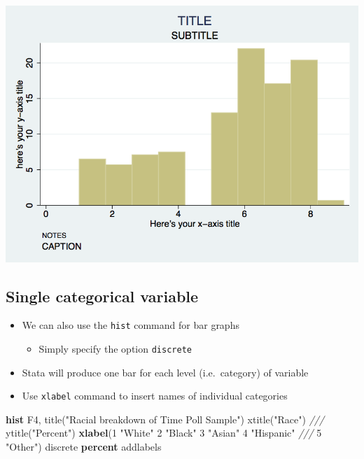 \documentclass[
]{book}
\newenvironment{Shaded}{\begin{snugshade}}{\end{snugshade}}
\newcommand{\BaseNTok}[1]{\textcolor[rgb]{0.00,0.00,0.81}{#1}}
\newcommand{\CommentTok}[1]{\textcolor[rgb]{0.56,0.35,0.01}{\textit{#1}}}
\newcommand{\KeywordTok}[1]{\textcolor[rgb]{0.13,0.29,0.53}{\textbf{#1}}}
\newcommand{\NormalTok}[1]{#1}
\newcommand{\StringTok}[1]{\textcolor[rgb]{0.31,0.60,0.02}{#1}}
\providecommand{\tightlist}{%
  \setlength{\itemsep}{0pt}\setlength{\parskip}{0pt}}
\begin{document}
\includegraphics{Stata/StataGraphics/images/hist2.png}

\hypertarget{single-categorical-variable}{%
\subsection{Single categorical variable}\label{single-categorical-variable}}

\begin{itemize}
\tightlist
\item
  We can also use the \texttt{hist} command for bar graphs

  \begin{itemize}
  \tightlist
  \item
    Simply specify the option \texttt{discrete}
  \end{itemize}
\item
  Stata will produce one bar for each level (i.e.~category) of variable
\item
  Use \texttt{xlabel} command to insert names of individual categories
\end{itemize}

\begin{Shaded}
\begin{Highlighting}[]
\KeywordTok{hist}\NormalTok{ F4, }\BaseNTok{title}\NormalTok{(}\StringTok{"Racial breakdown of Time Poll Sample"}\NormalTok{) }\BaseNTok{xtitle}\NormalTok{(}\StringTok{"Race"}\NormalTok{) }\CommentTok{///}
   \BaseNTok{ytitle}\NormalTok{(}\StringTok{"Percent"}\NormalTok{) }\KeywordTok{xlabel}\NormalTok{(1 }\StringTok{"White"}\NormalTok{ 2 }\StringTok{"Black"}\NormalTok{ 3 }\StringTok{"Asian"}\NormalTok{ 4 }\StringTok{"Hispanic"} \CommentTok{///}
\NormalTok{   5 }\StringTok{"Other"}\NormalTok{) discrete }\KeywordTok{percent} \BaseNTok{addlabels}
\end{Highlighting}
\end{Shaded}
\end{document}
